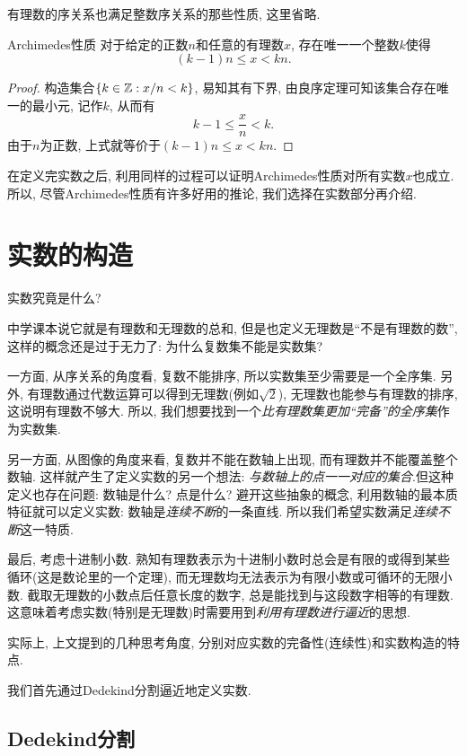 有理数的序关系也满足整数序关系的那些性质, 这里省略.

\begin{theorem}{Archimedes性质}
	对于给定的正数$n$和任意的有理数$x$, 存在唯一一个整数$k$使得$$(k-1)n \leq x < kn.$$
\end{theorem}
\begin{proof}
	构造集合$\{ k \in \mathbb{Z} :  x/n <k \}$, 易知其有下界, 由良序定理可知该集合存在唯一的最小元, 记作$k$, 从而有$$k-1 \leq \frac{x}{n} < k.$$
	由于$n$为正数, 上式就等价于$(k-1)n \leq x < kn$. 
\end{proof}

在定义完实数之后, 利用同样的过程可以证明Archimedes性质对所有实数$x$也成立.所以, 尽管Archimedes性质有许多好用的推论, 我们选择在实数部分再介绍.

\newpage
\section{实数的构造}

实数究竟是什么? 

中学课本说它就是有理数和无理数的总和, 但是也定义无理数是“不是有理数的数”, 这样的概念还是过于无力了: 为什么复数集不能是实数集? 

一方面, 从序关系的角度看, 复数不能排序, 所以实数集至少需要是一个全序集. 另外, 有理数通过代数运算可以得到无理数(例如$\sqrt{2}$), 无理数也能参与有理数的排序, 这说明有理数不够大. 所以, 我们想要找到一个\textit{比有理数集更加“完备”的全序集}作为实数集. 

另一方面, 从图像的角度来看, 复数并不能在数轴上出现, 而有理数并不能覆盖整个数轴. 这样就产生了定义实数的另一个想法: \textit{与数轴上的点一一对应的集合}.但这种定义也存在问题: 数轴是什么? 点是什么? 避开这些抽象的概念, 利用数轴的最本质特征就可以定义实数: 数轴是\textit{连续不断}的一条直线. 所以我们希望实数满足\textit{连续不断}这一特质. 

最后, 考虑十进制小数. 熟知有理数表示为十进制小数时总会是有限的或得到某些循环(这是数论里的一个定理), 而无理数均无法表示为有限小数或可循环的无限小数. 截取无理数的小数点后任意长度的数字, 总是能找到与这段数字相等的有理数. 这意味着考虑实数(特别是无理数)时需要用到\textit{利用有理数进行逼近}的思想. 

实际上, 上文提到的几种思考角度, 分别对应实数的完备性(连续性)和实数构造的特点.

我们首先通过Dedekind分割逼近地定义实数.

\subsection{Dedekind分割}

